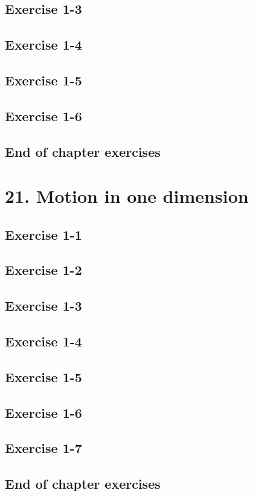 \begin{enumerate}[label=\textbf{\arabic*}., itemsep=5pt]
\subsection{Exercise 1-3}
\subsection{Exercise 1-4}
\subsection{Exercise 1-5}
\subsection{Exercise 1-6}
\subsection{End of chapter exercises}
\section{21. Motion in one dimension}
\subsection{Exercise 1-1}
\subsection{Exercise 1-2}
\subsection{Exercise 1-3}
\subsection{Exercise 1-4}
\subsection{Exercise 1-5}
\subsection{Exercise 1-6}
\subsection{Exercise 1-7}
\subsection{End of chapter exercises}

\end{enumerate}
